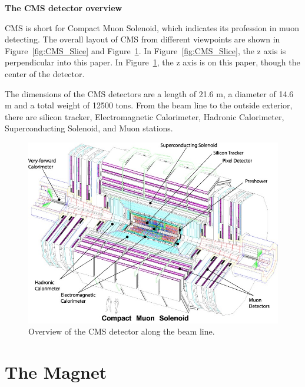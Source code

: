 {\bf The CMS detector overview}

CMS is short for Compact Muon Solenoid, which indicates its profession in muon detecting. 
The overall layout of CMS from different viewpoints are shown in Figure~\ref{fig:CMS_Slice} and Figure~\ref{fig:CMSLayout}. 
In Figure~\ref{fig:CMS_Slice}, the z axis is perpendicular into this paper. In Figure~\ref{fig:CMSLayout}, the z axis is on this paper, though the 
center of the detector.

The dimensions of the CMS detectors are a length of 21.6 m, a diameter of 14.6 m and a total weight of 12500 tons.  
From the beam line to the outside exterior, there are silicon tracker, Electromagnetic Calorimeter, Hadronic Calorimeter, Superconducting Solenoid, and Muon stations. 


\begin{figure}
\centering
\includegraphics[width=.9\textwidth]{figures/cms_complete_layout.jpg}
\caption{Overview of the CMS detector along the beam line.}
\label{fig:CMSLayout}
\end{figure}






\section{The Magnet}

